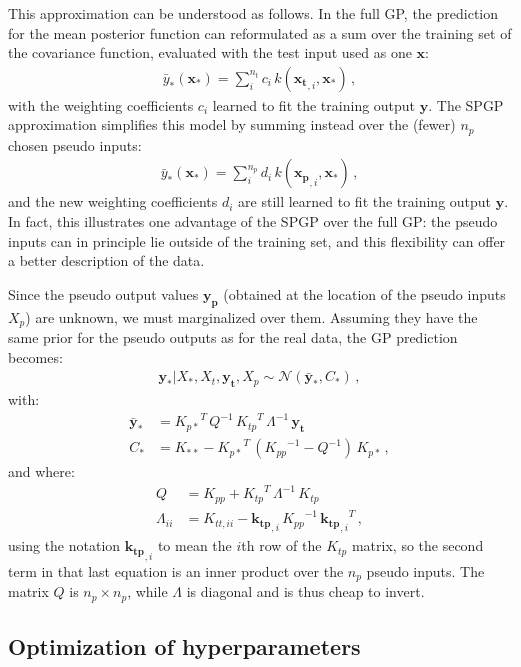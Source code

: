 \documentclass[11pt,a4paper]{article}
\numberwithin{equation}{section}
\begin{document}
This approximation can be understood as follows. In the full GP, the prediction for the mean posterior function can reformulated as a sum over the training set of the covariance function, evaluated with the test input used as one $\mathbf{x}$:
\begin{align}
\bar{y}_*(\mathbf{x_*}) = \sum_i^{n_t} c_i\,k(\mathbf{x_t}_{,i}, \mathbf{x_*})\,,
\end{align}
with the weighting coefficients $c_i$ learned to fit the training output $\mathbf{y}$. The SPGP approximation simplifies this model by summing instead over the (fewer) $n_p$ chosen pseudo inputs:
\begin{align}
\bar{y}_*(\mathbf{x_*}) = \sum_i^{n_p} d_i\,k(\mathbf{x_p}_{,i}, \mathbf{x_*})\,,
\end{align}
and the new weighting coefficients $d_i$ are still learned to fit the training output $\mathbf{y}$. In fact, this illustrates one advantage of the SPGP over the full GP: the pseudo inputs can in principle lie outside of the training set, and this flexibility can offer a better description of the data.

Since the pseudo output values $\mathbf{y_p}$ (obtained at the location of the pseudo inputs $X_p$) are unknown, we must marginalized over them. Assuming they have the same prior for the pseudo outputs as for the real data, the GP prediction becomes:
\begin{align}
\mathbf{y_*} | X_*, X_t, \mathbf{y_t}, X_p \sim \mathcal{N}(\mathbf{\bar{y}_*}, C_*)\,,
\end{align}
with:
\begin{align}
\mathbf{\bar{y}_*} &= {K_{p*}}^T\,Q^{-1}\,{K_{tp}}^T\,\Lambda^{-1}\,\mathbf{y_t}\, \\
C_* &= K_{**} - {K_{p*}}^T\,({K_{pp}}^{-1} - Q^{-1})\,K_{p*}\,,
\end{align}
and where:
\begin{align}
Q &= K_{pp} + {K_{tp}}^T\,\Lambda^{-1}\,K_{tp}\, \\
\Lambda_{ii} &= K_{tt,ii} - \mathbf{k_{tp}}_{,i}\,{K_{pp}}^{-1}\,{\mathbf{k_{tp}}_{,i}}^T \,,
\end{align}
using the notation $\mathbf{k_{tp}}_{,i}$ to mean the $i$th row of the $K_{tp}$ matrix, so the second term in that last equation is an inner product over the $n_p$ pseudo inputs. The matrix $Q$ is $n_p \times n_p$, while $\Lambda$ is diagonal and is thus cheap to invert.

\subsection{Optimization of hyperparameters}
\end{document}
